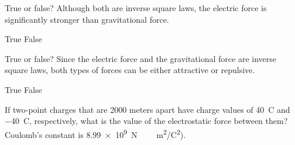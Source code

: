 \documentclass[]{exam}
\begin{document}
\begin{questions}
\question
True or false? Although both are inverse square laws, the electric force is significantly stronger than gravitational force.

\begin{choices}
\choice True
\choice False
\end{choices}

\question
True or false? Since the electric force and the gravitational force are inverse square laws, both types of forces can be either attractive or repulsive.

\begin{choices}
\choice True
\choice False
\end{choices}



\question
If two-point charges that are 2000 meters apart have charge values of \SI{40}{C} and \SI{-40}{C}, respectively, what is the
value of the electrostatic force between them? Coulomb's constant is  \SI{8.99e9}{N\,\cdot\,m^2/C^2}).

\end{questions}
\end{document}
